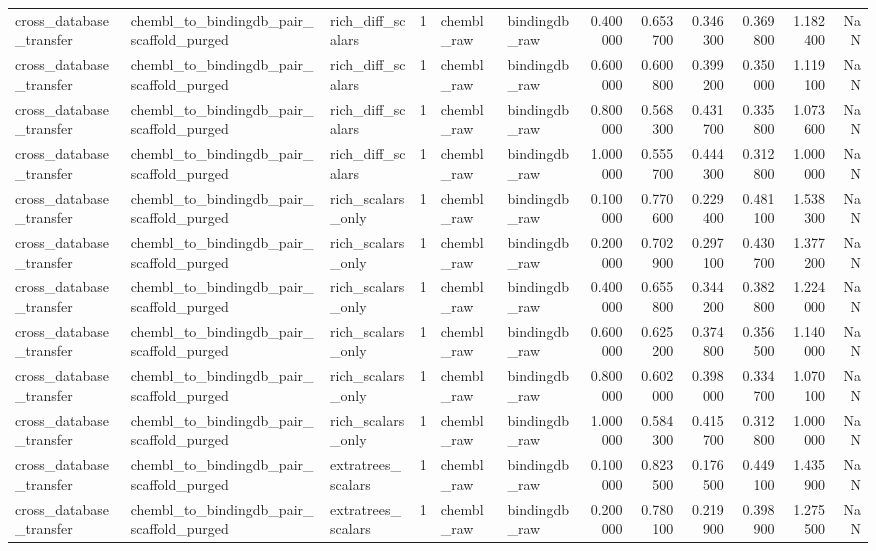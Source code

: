 \begin{longtable}{lllrllrrrrrr}
cross\_database\_transfer & chembl\_to\_bindingdb\_pair\_scaffold\_purged & rich\_diff\_scalars & 1 & chembl\_raw & bindingdb\_raw & 0.400000 & 0.653700 & 0.346300 & 0.369800 & 1.182400 & NaN \\
cross\_database\_transfer & chembl\_to\_bindingdb\_pair\_scaffold\_purged & rich\_diff\_scalars & 1 & chembl\_raw & bindingdb\_raw & 0.600000 & 0.600800 & 0.399200 & 0.350000 & 1.119100 & NaN \\
cross\_database\_transfer & chembl\_to\_bindingdb\_pair\_scaffold\_purged & rich\_diff\_scalars & 1 & chembl\_raw & bindingdb\_raw & 0.800000 & 0.568300 & 0.431700 & 0.335800 & 1.073600 & NaN \\
cross\_database\_transfer & chembl\_to\_bindingdb\_pair\_scaffold\_purged & rich\_diff\_scalars & 1 & chembl\_raw & bindingdb\_raw & 1.000000 & 0.555700 & 0.444300 & 0.312800 & 1.000000 & NaN \\
cross\_database\_transfer & chembl\_to\_bindingdb\_pair\_scaffold\_purged & rich\_scalars\_only & 1 & chembl\_raw & bindingdb\_raw & 0.100000 & 0.770600 & 0.229400 & 0.481100 & 1.538300 & NaN \\
cross\_database\_transfer & chembl\_to\_bindingdb\_pair\_scaffold\_purged & rich\_scalars\_only & 1 & chembl\_raw & bindingdb\_raw & 0.200000 & 0.702900 & 0.297100 & 0.430700 & 1.377200 & NaN \\
cross\_database\_transfer & chembl\_to\_bindingdb\_pair\_scaffold\_purged & rich\_scalars\_only & 1 & chembl\_raw & bindingdb\_raw & 0.400000 & 0.655800 & 0.344200 & 0.382800 & 1.224000 & NaN \\
cross\_database\_transfer & chembl\_to\_bindingdb\_pair\_scaffold\_purged & rich\_scalars\_only & 1 & chembl\_raw & bindingdb\_raw & 0.600000 & 0.625200 & 0.374800 & 0.356500 & 1.140000 & NaN \\
cross\_database\_transfer & chembl\_to\_bindingdb\_pair\_scaffold\_purged & rich\_scalars\_only & 1 & chembl\_raw & bindingdb\_raw & 0.800000 & 0.602000 & 0.398000 & 0.334700 & 1.070100 & NaN \\
cross\_database\_transfer & chembl\_to\_bindingdb\_pair\_scaffold\_purged & rich\_scalars\_only & 1 & chembl\_raw & bindingdb\_raw & 1.000000 & 0.584300 & 0.415700 & 0.312800 & 1.000000 & NaN \\
cross\_database\_transfer & chembl\_to\_bindingdb\_pair\_scaffold\_purged & extratrees\_scalars & 1 & chembl\_raw & bindingdb\_raw & 0.100000 & 0.823500 & 0.176500 & 0.449100 & 1.435900 & NaN \\
cross\_database\_transfer & chembl\_to\_bindingdb\_pair\_scaffold\_purged & extratrees\_scalars & 1 & chembl\_raw & bindingdb\_raw & 0.200000 & 0.780100 & 0.219900 & 0.398900 & 1.275500 & NaN \\

\end{longtable}
